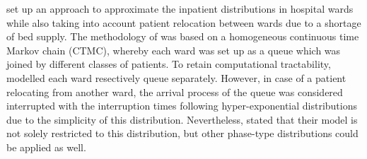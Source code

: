 \documentclass[11pt,a4paper]{article}
\begin{document}
\begin{spacing}{1.8}
\citet{Andersen2023} set up an approach to approximate the inpatient distributions in hospital wards while also taking into account patient relocation  between wards due to a shortage of bed supply.  The methodology of \citep{Andersen2023} was based on a homogeneous continuous time Markov chain (CTMC), whereby each ward was set up as a queue which was joined by different classes of patients. To retain computational tractability, \citet{Andersen2023} modelled each ward resectively queue separately. However, in case of a patient relocating from another ward, the arrival process of the queue was considered interrupted with the interruption times following hyper-exponential distributions due to the simplicity of this distribution. Nevertheless, \citet{Andersen2023} stated that their model is not solely restricted to this distribution, but other phase-type distributions could be applied as well.  


\end{spacing}
\end{document}

